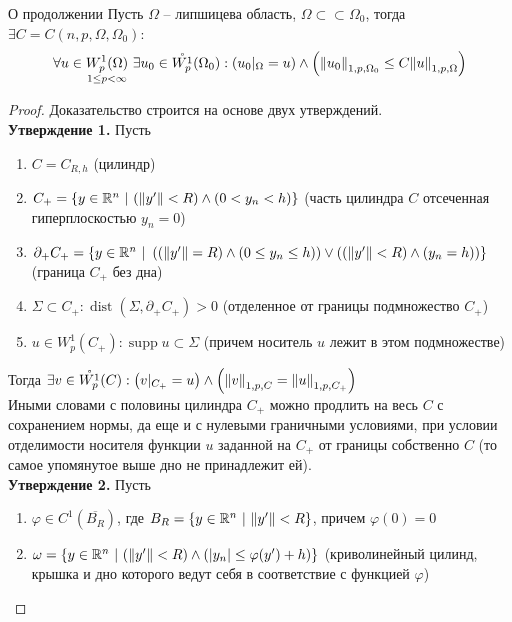 \documentclass[12pt,a4paper]{article}
\newcommand{\Real}{\mathbb{R}}
\newcommand{\ssubset}{\subset \subset}
\DeclareMathOperator\supp{supp}
\DeclareMathOperator\dist{dist}
\begin{document}
\begin{theorem}{О продолжении}{}
	Пусть $\Omega$ -- липшицева область, $\Omega \ssubset \Omega_0$, тогда $\exists C = C(n, p, \Omega, \Omega_0)$:
	\begin{equation*}
		\forall u \in \underset{1 \leq p < \infty}{W_p^1 (\Omega)} \ \exists u_0 \in \mathring{W_p^1} (\Omega_0): \left(u_0 |_\Omega = u\right) \wedge \left(\norm{u_0}_{1, p, \Omega_0} \leq C \norm{u}_{1, p, \Omega}\right)
	\end{equation*}
\end{theorem}
\begin{proof}
	Доказательство строится на основе двух утверждений. \\
	\textbf{Утверждение 1.} Пусть
	\begin{enumerate}
		\item $C = C_{R, h}$ (цилиндр)
		\item $C_+ = \{ y \in \Real^n \ | \ (\norm{y^\prime} < R) \wedge (0 < y_n < h) \}$ (часть цилиндра $C$ отсеченная гиперплоскостью $y_n = 0$)
		\item $\partial_+ C_+ = \{ y \in \Real^n \ | \ \left(\left(\norm{y^\prime} = R\right)\wedge \left(0 \leq y_n \leq h\right)\right)\vee\left(\left(\norm{y^\prime} < R\right)\wedge\left(y_n = h\right)\right)\}$ (граница $C_+$ без дна)
		\item $\Sigma \subset C_+: \dist(\Sigma, \partial_+ C_+) > 0$ (отделенное от границы подмножество $C_+$)
		\item $u \in W_p^1 (C_+): \supp{u} \subset \Sigma$ (причем носитель $u$ лежит в этом подмножестве)
	\end{enumerate}
	Тогда $\exists v \in \mathring{W_p^1} (C): \left(v|_{C_+} = u\right) \wedge \left(\norm{v}_{1, p, C} = \norm{u}_{1, p, C_+}\right)$ \\ Иными словами с половины цилиндра $C_+$ можно продлить на весь $C$ с сохранением нормы, да еще и с нулевыми граничными условиями, при условии отделимости носителя функции $u$ заданной на $C_+$ от границы собственно $C$ (то самое упомянутое выше дно не принадлежит ей). \\
	\textbf{Утверждение 2.} Пусть
	\begin{enumerate}
		\item $\varphi \in C^1 (\overline{B_R})$, где $B_R = \{ y \in \Real^n \ | \ \norm{y^\prime} < R\}$, причем $\varphi(0) = 0$
		\item $\omega = \{ y \in \Real^n \ | \ (\norm{y^\prime} < R) \wedge (|y_n| \leq \varphi (y^\prime) + h) \}$ (криволинейный цилинд, крышка и дно которого ведут себя в соответствие с функцией $\varphi$)

\end{enumerate}
\end{proof}
\end{document}
